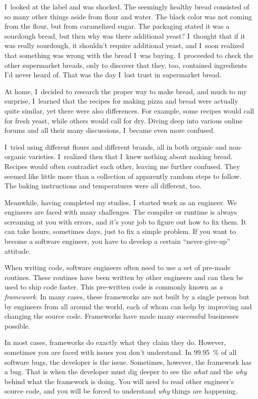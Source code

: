 I~looked at the label and was shocked. The seemingly
healthy bread consisted of so many other things aside from flour and water.
The black color was not coming from the flour, but from caramelized sugar.
The packaging stated it was a sourdough bread, but then why was there additional yeast?
I~thought that if it was really sourdough, it shouldn't require additional yeast, and I~soon 
realized that something was wrong with the bread I~was buying.
I~proceeded to check the other supermarket breads, only to discover that they, too,
contained ingredients I'd never heard of. That was the day I~lost trust
in supermarket bread.

At home, I~decided to research the proper way to make bread, and much to my surprise,
I~learned that the recipes for making pizza and bread were actually quite similar, yet
there were also differences. For example, some recipes would call for fresh yeast, while
others would call for dry. Diving deep into various online forums and all their many
discussions, I~became even more confused.

I~tried using different flours and different brands, all in both organic and non-organic varieties.
I~realized then that I~knew nothing about making bread. Recipes would often contradict each other,
leaving me further confused. They seemed like little more than a collection of apparently random
steps to follow. The baking instructions and temperatures were all different, too.

Meanwhile, having completed my studies, I~started work as an engineer.
We engineers are faced with many challenges. The compiler or runtime is
always screaming at you with errors, and it's your job to figure out how to fix them.
It can take hours, sometimes days, just to fix a simple problem. If you want
to become a software engineer, you have to develop a certain ``never-give-up'' attitude.

When writing code, software engineers often need to use a set of pre-made routines. These routines have been
written by other engineers and can then be used to ship code faster.
This pre-written code is commonly known as \emph{a framework}. In many cases,
these frameworks are not built by a single person but by engineers from all around the world,
each of whom can help by improving and changing the source code. Frameworks have made many successful
businesses possible.

In most cases, frameworks do exactly what they claim they do. However,
sometimes you are faced with issues you don't understand. In \qty{99.95}{\percent}
of all software bugs, the developer is the issue. Sometimes, however, the framework has a
bug. That is when the developer must dig deeper to see the \emph{what} and the
\emph{why} behind what
the framework is doing. You will need to read other engineer's source code, and you will be forced
to understand \emph{why} things are happening.

